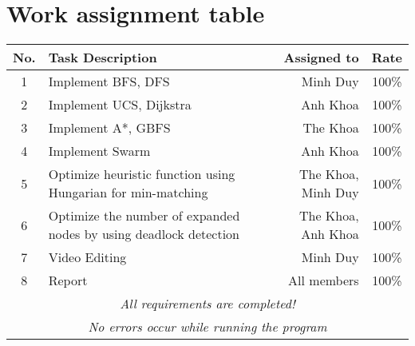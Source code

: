 \section{Work assignment table}
\begin{center}
  \renewcommand{\arraystretch}{1.5}
  \begin{tabular}{|c|p{}|r|c|}
    \hline
    \textbf{No.} & \textbf{Task Description}                                         & \textbf{Assigned to} & \textbf{Rate} \\\hline
    1            & Implement BFS, DFS                                                & Minh Duy             & 100\%         \\\hline
    2            & Implement UCS, Dijkstra                                           & Anh Khoa             & 100\%         \\\hline
    3            & Implement A*, GBFS                                                & The Khoa             & 100\%         \\\hline
    4            & Implement Swarm                                                   & Anh Khoa             & 100\%         \\\hline
    5            & Optimize heuristic function using Hungarian for min-matching      & The Khoa, Minh Duy   & 100\%         \\\hline
    6            & Optimize the number of expanded nodes by using deadlock detection & The Khoa, Anh Khoa   & 100\%         \\\hline
    7            & Video Editing                                                     & Minh Duy             & 100\%         \\\hline
    8            & Report                                                            & All members          & 100\%         \\\hline
    \multicolumn{4}{|c|}{\textsl{All requirements are completed!}}                                                          \\
    \multicolumn{4}{|c|}{\textsl{No errors occur while running the program}}                                                \\\hline
  \end{tabular}
\end{center}
